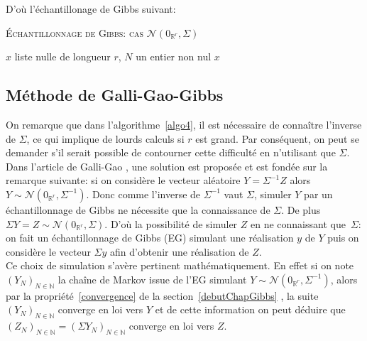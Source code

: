 \noindent D'où l'échantillonage de Gibbs suivant:
~\\
\begin{algorithm}
\caption{\textsc{Échantillonnage de Gibbs: cas $\mathcal{N}(0_{\mathbb{R}^{r}},\Sigma)$}}
\label{algo4}
\begin{algorithmic}
\REQUIRE $x$ liste nulle de longueur $r$, $N$ un entier non nul
\BEGIN 
{}  
\ENDFOR
\END
\ENSURE $x$ \\
\end{algorithmic}
\end{algorithm}

\newpage
\subsection{Méthode de Galli-Gao-Gibbs}

On remarque que dans l'algorithme~\ref{algo4}, il est nécessaire de connaître l'inverse de $\Sigma$, ce qui implique de lourds calculs si $r$ est grand.
Par conséquent, on peut se demander s'il serait possible de contourner cette difficulté en n'utilisant que $\Sigma$.
Dans l'article de Galli-Gao \cite{GALLIAlain2001Roco}, une solution est proposée et est
fondée sur la remarque suivante: si on considère le vecteur aléatoire $Y = \Sigma^{-1} Z$ alors
$Y \sim \mathcal{N}(0_{\mathbb{R}^{r}},\Sigma^{-1})$. Donc comme l'inverse de $\Sigma^{-1}$ vaut $\Sigma$, simuler $Y$ par un échantillonnage de Gibbs ne nécessite
que la connaissance de $\Sigma$. De plus $\Sigma Y = Z \sim \mathcal{N}(0_{\mathbb{R}^{r}},\Sigma)$. D'où la possibilité de simuler $Z$ en ne connaissant que~$\Sigma$: on fait un
échantillonnage de Gibbs (EG) simulant une réalisation $y$ de $Y$ puis on considère le vecteur $\Sigma y$ afin d'obtenir une réalisation de $Z$.
~\\

Ce choix de simulation s'avère pertinent mathématiquement. En effet si on note
$(Y_N)_{N \in \mathbb{N}}$ la chaîne de Markov issue de l'EG simulant $Y \sim \mathcal{N}(0_{\mathbb{R}^{r}},\Sigma^{-1})$, alors par la propriété~\ref{convergence} de la section~\ref{debutChapGibbs} , la suite
$(Y_N)_{N \in \mathbb{N}}$ converge en loi vers $Y$ et de cette information on peut
déduire que $(Z_N)_{N \in \mathbb{N}} = (\Sigma Y_N)_{N \in \mathbb{N}}$ converge en loi vers $Z$.\\

